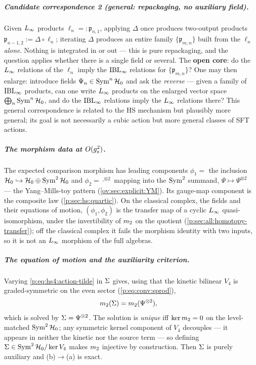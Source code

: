 \subparagraph{Candidate correspondence 2 (general: repackaging, no auxiliary field).} Given
$L_\infty$ products $\ell_n=:\mathfrak p_{n,1}$, applying $\Delta$ once produces two-output
products $\mathfrak p_{n-1,2}:=\Delta\circ\ell_n$; iterating $\Delta$ produces an entire
family $\{\mathfrak p_{m,n}\}$ built from the $\ell_n$ \emph{alone}. Nothing is
integrated in or out --- this is pure repackaging, and the question applies whether there
is a single field or several. The \textbf{open core}: do the $L_\infty$ relations of the
$\ell_n$ imply the $\mathrm{IBL}_\infty$ relations for $\{\mathfrak p_{m,n}\}$? One may then enlarge:
introduce fields $\Psi_n\in\operatorname{Sym}^n\mathcal{H}_0$ and ask the \emph{reverse} --- given a family
of $\mathrm{IBL}_\infty$ products, can one write $L_\infty$ products on the enlarged vector space
$\bigoplus_n\operatorname{Sym}^n\mathcal{H}_0$, and do the $\mathrm{IBL}_\infty$ relations imply the $L_\infty$ relations there?
This general correspondence is related to the HS mechanism but plausibly more general;
its goal is not necessarily a cubic action but more general classes of SFT actions.

\subparagraph{The morphism data at $O(g_s^2)$.} The expected comparison morphism has leading
components $\phi_1=$ the inclusion $\mathcal{H}_0\hookrightarrow\mathcal{H}_0\oplus\operatorname{Sym}^2\mathcal{H}_0$ and
$\phi_2=\cdot^{\otimes2}$ mapping into the $\operatorname{Sym}^2$ summand, $\Psi\mapsto\Psi^{\otimes2}$
--- the Yang--Mills-toy pattern (\cref{ov:sec:explicit:YM}). Its gauge-map component is the composite law (\cref{p:sec:hs:quartic}).
On the classical complex, the fields and their equations of motion, $(\phi_1,\phi_2)$ is the transfer map of a cyclic $L_\infty$ quasi-isomorphism, under the invertibility of $m_2$ on the quotient (\cref{p:sec:all:homotopy-transfer}); off the classical complex it fails the morphism identity with two inputs, so it is not an $L_\infty$ morphism of the full algebras.

\subparagraph{The equation of motion and the auxiliarity criterion.} Varying \eqref{p:eq:hs4:action-tilde} in
$\Sigma$ gives, using that the kinetic bilinear $V_4$ is graded-symmetric on the even sector
(\cref{p:eq:conv:sprod}),
\begin{equation}
	m_2(\Sigma)=m_2(\Psi^{\otimes2}),
	\label{ped:eq:Sigeom}
\end{equation}
which is solved by $\Sigma=\Psi^{\otimes2}$. The solution is \emph{unique} iff
$\ker m_2=0$ on the level-matched $\operatorname{Sym}^2\mathcal{H}_0$; any symmetric kernel
component of $V_4$ decouples --- it appears in neither the kinetic nor the source term --- so
defining $\Sigma\in\operatorname{Sym}^2\mathcal{H}_0/\ker V_4$ makes $m_2$ injective by construction. Then $\Sigma$ is purely auxiliary and (b)$\to$(a) is exact.

